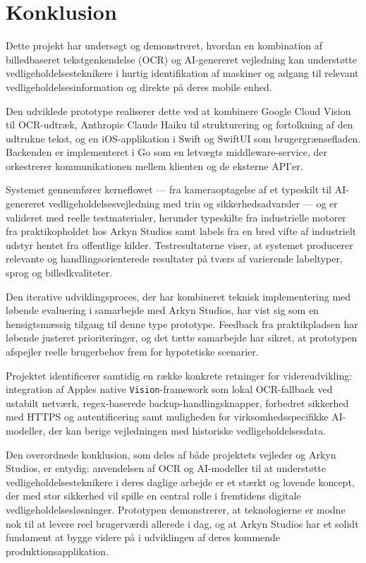 \chapter{Konklusion}
\label{chap:conclusion}

Dette projekt har undersøgt og demonstreret, hvordan en kombination af billedbaseret tekstgenkendelse (OCR) og AI-genereret vejledning kan understøtte vedligeholdelsesteknikere i hurtig identifikation af maskiner og adgang til relevant vedligeholdelsesinformation og direkte på deres mobile enhed.

Den udviklede prototype realiserer dette ved at kombinere Google Cloud Vision til OCR-udtræk, Anthropic Claude Haiku til strukturering og fortolkning af den udtrukne tekst, og en iOS-applikation i Swift og SwiftUI som brugergrænsefladen. Backenden er implementeret i Go som en letvægts middleware-service, der orkestrerer kommunikationen mellem klienten og de eksterne API'er.

Systemet gennemfører kerneflowet — fra kameraoptagelse af et typeskilt til AI-genereret vedligeholdelsesvejledning med trin og sikkerhedsadvarsler — og er valideret med reelle testmaterialer, herunder typeskilte fra industrielle motorer fra praktikopholdet hos Arkyn Studios samt labels fra en bred vifte af industrielt udstyr hentet fra offentlige kilder. Testresultaterne viser, at systemet producerer relevante og handlingsorienterede resultater på tværs af varierende labeltyper, sprog og billedkvaliteter.

Den iterative udviklingsproces, der har kombineret teknisk implementering med løbende evaluering i samarbejde med Arkyn Studios, har vist sig som en hensigtsmæssig tilgang til denne type prototype. Feedback fra praktikpladsen har løbende justeret prioriteringer, og det tætte samarbejde har sikret, at prototypen afspejler reelle brugerbehov frem for hypotetiske scenarier.

Projektet identificerer samtidig en række konkrete retninger for videreudvikling: integration af Apples native \texttt{Vision}-framework som lokal OCR-fallback ved ustabilt netværk, regex-baserede backup-handlingsknapper, forbedret sikkerhed med HTTPS og autentificering samt muligheden for virksomhedsspecifikke AI-modeller, der kan berige vejledningen med historiske vedligeholdelsesdata.

Den overordnede konklusion, som deles af både projektets vejleder og Arkyn Studios, er entydig: anvendelsen af OCR og AI-modeller til at understøtte vedligeholdelsesteknikere i deres daglige arbejde er et stærkt og lovende koncept, der med stor sikkerhed vil spille en central rolle i fremtidens digitale vedligeholdelsesløsninger. Prototypen demonstrerer, at teknologierne er modne nok til at levere reel brugerværdi allerede i dag, og at Arkyn Studios har et solidt fundament at bygge videre på i udviklingen af deres kommende produktionsapplikation.
